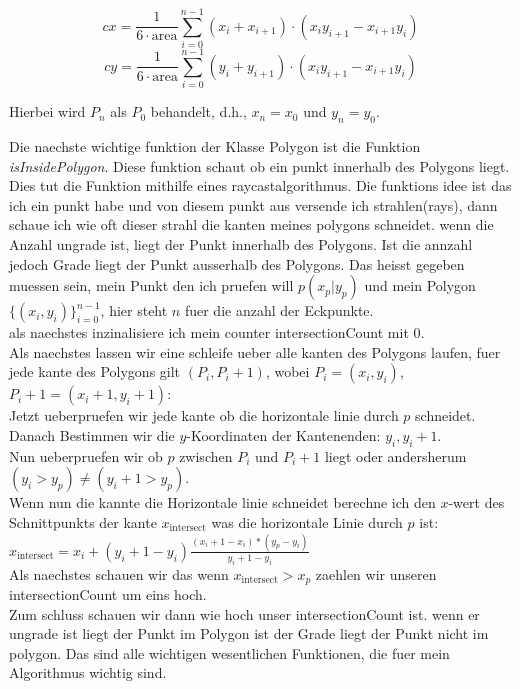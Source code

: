 \documentclass{article}
\begin{document}
\[
cx = \frac{1}{6 \cdot \text{area}} \sum_{i=0}^{n-1} (x_i + x_{i+1}) \cdot (x_i y_{i+1} - x_{i+1} y_i)
\]
\[
cy = \frac{1}{6 \cdot \text{area}} \sum_{i=0}^{n-1} (y_i + y_{i+1}) \cdot (x_i y_{i+1} - x_{i+1} y_i)
\]

Hierbei wird $P_{n}$ als $P_0$ behandelt, d.h., $x_{n} = x_0$ und $y_{n} = y_0$. 
\par\medskip
Die naechste wichtige funktion der Klasse Polygon ist die Funktion \textit{isInsidePolygon}. Diese funktion schaut ob ein punkt innerhalb des Polygons liegt. Dies tut die Funktion mithilfe eines raycastalgorithmus. Die funktions idee ist das ich ein punkt habe und von diesem punkt aus versende ich strahlen(rays), dann schaue ich wie oft dieser strahl die kanten meines polygons schneidet. wenn die Anzahl ungrade ist, liegt der Punkt innerhalb des Polygons. Ist die annzahl jedoch Grade liegt der Punkt ausserhalb des Polygons. Das heisst gegeben muessen sein, mein Punkt den ich pruefen will $p(x_p|y_p)$ und mein Polygon \( \{ (x_i, y_i) \}_{i=0}^{n-1} \), hier steht $n$ fuer die anzahl der Eckpunkte.
\\
als naechstes inzinalisiere ich mein counter intersectionCount mit 0.
\\
Als naechstes lassen wir eine schleife ueber alle kanten des Polygons laufen, fuer jede kante des Polygons gilt $(P_i,P_i+1)$, wobei $P_i = (x_i,y_i)$, $P_i+1 = (x_i+1, y_i+1)$: 
\\
Jetzt ueberpruefen wir jede kante ob die horizontale linie durch $p$ schneidet.
\\
Danach Bestimmen wir die $y$-Koordinaten der Kantenenden: $y_i, y_i+1$.
\\
Nun ueberpruefen wir ob $p$ zwischen $P_i$ und $P_i+1$ liegt oder andersherum $(y_i > y_p) \neq (y_i+1 > y_p)$.
\\
Wenn nun die kannte die Horizontale linie schneidet berechne ich den $x$-wert des Schnittpunkts der kante $x_\text{intersect}$ was die horizontale Linie durch $p$ ist:
\\
$x_\text{intersect} = x_i + (y_i+1 - y_i)\frac{(x_i+1 - x_i) * (y_p - y_i)}{y_i+1 - y_i}$
\\
Als naechstes schauen wir das wenn $x_\text{intersect} > x_p$ zaehlen wir unseren intersectionCount um eins hoch.
\\
Zum schluss schauen wir dann wie hoch unser intersectionCount ist.  wenn er ungrade ist liegt der Punkt im Polygon ist der Grade liegt der Punkt nicht im polygon. Das sind alle wichtigen wesentlichen Funktionen, die fuer mein Algorithmus wichtig sind.
\end{document}
